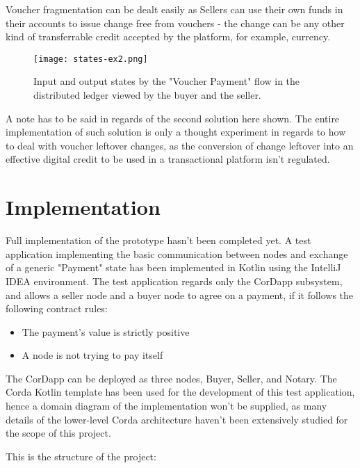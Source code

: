 Voucher fragmentation can be dealt easily as Sellers can use their own funds in their accounts to issue change free from vouchers - the change can be any other kind of transferrable credit accepted by the platform, for example, currency.

\begin{figure}[h!]
    \centering
    \texttt{[image: states-ex2.png]}
    \caption{
       Input and output states by the "Voucher Payment" flow in the distributed ledger viewed by the buyer and the seller.
        }
\end{figure}

A note has to be said in regards of the second solution here shown. The entire implementation of such solution is only a thought experiment in regards to how to deal with voucher leftover changes, as the conversion of change leftover into an effective digital credit to be used in a transactional platform isn't regulated.


\section{Implementation}

Full implementation of the prototype hasn't been completed yet. A test application implementing the basic communication between nodes and exchange of a generic "Payment" state has been implemented in Kotlin using the IntelliJ IDEA environment. The test application regards only the CorDapp subsystem, and allows a seller node and a buyer node to agree on a payment, if it follows the following contract rules: 

\begin{itemize}
    \item The payment's value is strictly positive
    \item A node is not trying to pay itself
\end{itemize}

The CorDapp can be deployed as three nodes, Buyer, Seller, and Notary.
The Corda Kotlin template has been used for the development of this test application, hence a domain diagram of the implementation won't be supplied, as many details of the lower-level Corda architecture haven't been extensively studied for the scope of this project.

This is the structure of the project:

